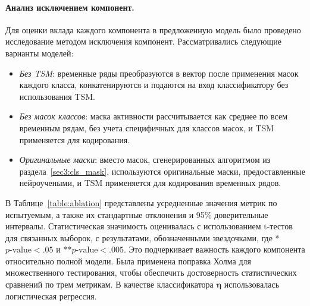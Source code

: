 \paragraph{Анализ исключением компонент.}
Для оценки вклада каждого компонента в предложенную модель было проведено исследование методом исключения компонент. Рассматривались следующие варианты моделей:
\begin{itemize}
    \item \textit{Без TSM}: временные ряды преобразуются в вектор после применения масок каждого класса, конкатенируются и подаются на вход классификатору без использования TSM.
    \item \textit{Без масок классов}: маска активности рассчитывается как среднее по всем временным рядам, без учета специфичных для классов масок, и TSM применяется для кодирования.
    \item \textit{Оригинальные маски}: вместо масок, сгенерированных алгоритмом из раздела~\ref{sec3:cls_mask}, используются оригинальные маски, предоставленные нейроучеными, и TSM применяется для кодирования временных рядов.
\end{itemize}

В Таблице~\ref{table:ablation} представлены усредненные значения метрик по испытуемым, а также их стандартные отклонения и 95\% доверительные интервалы. Статистическая значимость оценивалась с использованием t-тестов для связанных выборок, с результатами, обозначенными звездочками, где *$p\text{-value}<.05$ и **$p\text{-value}<.005$. Это подчеркивает важность каждого компонента относительно полной модели. Была применена поправка Холма для множественного тестирования, чтобы обеспечить достоверность статистических сравнений по трем метрикам. В качестве классификатора $ \boldsymbol{\eta}$ использовалась логистическая регрессия.

